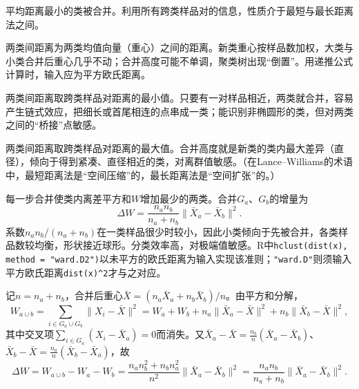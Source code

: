 \begin{description}[style=nextline,leftmargin=0pt,labelwidth=0pt,labelsep=0pt]
\item[类平均法（average）]平均距离最小的类被合并。利用所有跨类样品对的信息，性质介于最短与最长距离法之间。
\item[重心法（centroid）]两类间距离为两类均值向量（重心）之间的距离。新类重心按样品数加权，大类与小类合并后重心几乎不动；合并高度可能不单调，聚类树出现“倒置”。用递推公式计算时，输入应为平方欧氏距离。
\item[最短距离法（single）]两类间距离取跨类样品对距离的最小值。只要有一对样品相近，两类就合并，容易产生链式效应，把细长或首尾相连的点串成一类；能识别非椭圆形的类，但对两类之间的“桥接”点敏感。
\item[最长距离法（complete）]两类间距离取跨类样品对距离的最大值。合并高度就是新类的类内最大差异（直径），倾向于得到紧凑、直径相近的类，对离群值敏感。（在Lance--Williams的术语中，最短距离法是“空间压缩”的，最长距离法是“空间扩张”的。）
\item[Ward法]每一步合并使类内离差平方和$W$增加最少的两类。合并$G_a$、$G_b$的增量为
\[
\Delta W=\frac{n_an_b}{n_a+n_b}\|\bar X_a-\bar X_b\|^2.
\]
系数$n_an_b/(n_a+n_b)$在一类样品很少时较小，因此小类倾向于先被合并，各类样品数较均衡，形状接近球形。分类效率高，对极端值敏感。R中\texttt{hclust(dist(x), method = \string"ward.D2\string")}以未平方的欧氏距离为输入实现该准则；\texttt{\string"ward.D\string"}则须输入平方欧氏距离\texttt{dist(x)\string^2}才与之对应。
\end{description}
\begin{zm}[Ward合并增量]
记$n=n_a+n_b$，合并后重心$\bar X=(n_a\bar X_a+n_b\bar X_b)/n$。由平方和分解，
\[
W_{a\cup b}=\sum_{i\in G_a\cup G_b}\|X_i-\bar X\|^2=W_a+W_b+n_a\|\bar X_a-\bar X\|^2+n_b\|\bar X_b-\bar X\|^2,
\]
其中交叉项$\sum_{i\in G_a}(X_i-\bar X_a)=0$而消失。又$\bar X_a-\bar X=\frac{n_b}{n}(\bar X_a-\bar X_b)$、$\bar X_b-\bar X=\frac{n_a}{n}(\bar X_b-\bar X_a)$，故
\[
\Delta W=W_{a\cup b}-W_a-W_b=\frac{n_an_b^2+n_bn_a^2}{n^2}\|\bar X_a-\bar X_b\|^2=\frac{n_an_b}{n_a+n_b}\|\bar X_a-\bar X_b\|^2.
\]
\end{zm}
